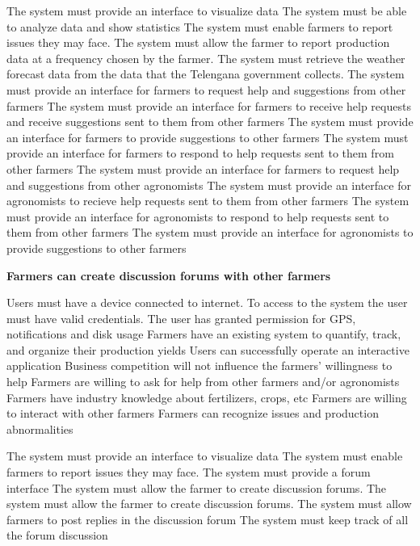 \begin{itemize}
\begin{itemize}
 The system must provide an interface to visualize data
 The system must be able to analyze data and show statistics
 The system must enable farmers to report issues they may face.
 The system must allow the farmer to report production data at a frequency chosen by the farmer.
 The system must retrieve the weather forecast data from the data that the Telengana government collects.
 The system must provide an interface for farmers to request help and suggestions from other farmers
 The system must provide an interface for farmers to receive help requests and receive suggestions sent to them from other farmers
 The system must provide an interface for farmers to provide suggestions to other farmers
 The system must provide an interface for farmers to respond to help requests sent to them from other farmers
 The system must provide an interface for farmers to request help and suggestions from other agronomists
 The system must provide an interface for agronomists to recieve help requests sent to them from other farmers
 The system must provide an interface for agronomists to respond to help requests sent to them from other farmers 
 The system must provide an interface for agronomists to provide suggestions to other farmers
\end{itemize}

 \textbf{Farmers can create discussion forums with other farmers}
\begin{itemize}
  Users must have a device connected to internet.
 To access to the system the user must have valid credentials.
 The user has granted permission for GPS, notifications and disk usage
 Farmers have an existing system to quantify, track, and organize their production yields
 Users can successfully operate an interactive application
 Business competition will not influence the farmers' willingness to help
 Farmers are willing to ask for help from other farmers and/or agronomists
 Farmers have industry knowledge about fertilizers, crops, etc 
 Farmers are willing to interact with other farmers 
 Farmers can recognize issues and production abnormalities


 The system must provide an interface to visualize data
 The system must enable farmers to report issues they may face.
  The system must provide a forum interface
  The system must allow the farmer to create discussion forums.
  The system must allow the farmer to create discussion forums.
  The system must allow farmers to post replies in the discussion forum
  The system must keep track of all the forum discussion
\end{itemize}


\end{itemize}
